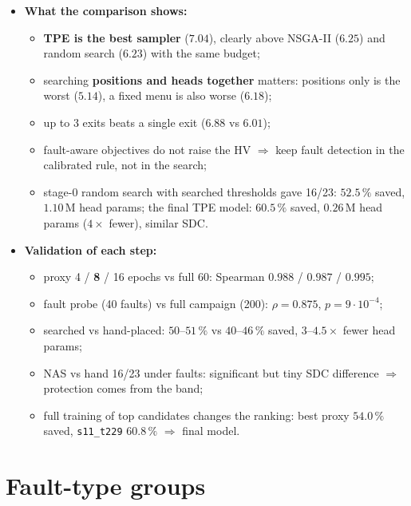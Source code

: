\documentclass[10pt,a4paper]{article}
\newcommand{\meth}[1]{\texttt{#1}}
\begin{document}
\begin{itemize}
  \item \textbf{What the comparison shows:}
  \begin{itemize}
    \item \textbf{TPE is the best sampler} ($7.04$), clearly above NSGA-II ($6.25$) and random search ($6.23$)
          with the same budget;
    \item searching \textbf{positions and heads together} matters: positions only is the worst ($5.14$), a fixed
          menu is also worse ($6.18$);
    \item up to 3 exits beats a single exit ($6.88$ vs $6.01$);
    \item fault-aware objectives do not raise the HV $\Rightarrow$ keep fault detection in the calibrated rule,
          not in the search;
    \item stage-0 random search with searched thresholds gave 16/23: $52.5\,\%$ saved, $1.10$\,M head params;
          the final TPE model: $60.5\,\%$ saved, $0.26$\,M head params ($4\times$ fewer), similar SDC.
  \end{itemize}
  \item \textbf{Validation of each step:}
  \begin{itemize}
    \item proxy 4 / \textbf{8} / 16 epochs vs full 60: Spearman $0.988$ / $\mathbf{0.987}$ / $0.995$;
    \item fault probe (40 faults) vs full campaign (200): $\rho=0.875$, $p=9\cdot10^{-4}$;
    \item searched vs hand-placed: $50$--$51\,\%$ vs $40$--$46\,\%$ saved, $3$--$4.5\times$ fewer head params;
    \item NAS vs hand 16/23 under faults: significant but tiny SDC difference $\Rightarrow$ protection comes from
          the band;
    \item full training of top candidates changes the ranking: best proxy $54.0\,\%$ saved, \meth{s11\_t229}
          $\mathbf{60.8\,\%}$ $\Rightarrow$ final model.
  \end{itemize}
\end{itemize}

\section{Fault-type groups}
\end{document}
